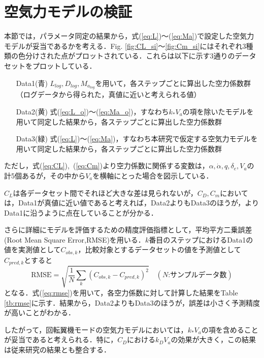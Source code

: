 \section{空気力モデルの検証}
\label{sec:airf_model_ver}

本節では，パラメータ同定の結果から，式(\ref{eq:L})〜(\ref{eq:Ma})で設定した空気力モデルが妥当であるかを考える．Fig. \ref{fig:CL_si}〜\ref{fig:Cm_si}にはそれぞれ3種類の色分けされた点がプロットされている．これらは以下に示す3通りのデータセットをプロットしている．

\begin{itemize}
  \setlength{\leftskip}{1.0cm}
  \setlength{\rightskip}{0.5cm}
  \item[Data1(青)] $L_{log},D_{log},M_{a_{log}}$を用いて，各ステップごとに算出した空力係数群\\（ログデータから得られた，真値に近いと考えられる値）
  \item[Data2(黄)] 式(\ref{eq:L_o})〜(\ref{eq:Ma_o})，すなわち$k_* V_a$の項を除いたモデルを用いて同定した結果から，各ステップごとに算出した空力係数群
  \item[Data3(緑)] 式(\ref{eq:L})〜(\ref{eq:Ma})，すなわち本研究で仮定する空気力モデルを用いて同定した結果から，各ステップごとに算出した空力係数群
\end{itemize}

ただし，式(\ref{eq:CL}),~(\ref{eq:Cm})より空力係数に関係する変数は，$\alpha,\dot{\alpha},q,\delta_e,V_a$の計5個あるが，その中から$V_a$を横軸にとった場合を図示している．

$C_L$は各データセット間でそれほど大きな差は見られないが，$C_D,C_m$においては，Data1が真値に近い値であると考えれば，Data2よりもData3のほうが，よりData1に沿うように点在していることが分かる．

さらに詳細にモデルを評価するための精度評価指標として，平均平方二乗誤差(Root Mean Square Error,RMSE)を用いる．$k$番目のステップにおけるData1の値を実測値として$C_{obs,k}$，比較対象とするデータセットの値を予測値として$C_{pred,k}$とすると
\begin{equation}
  \mbox{RMSE} = \sqrt{\dfrac{1}{N}\sum_{k}(C_{obs,k}-C_{pred,k})^{2}} \quad (N\mbox{:サンプルデータ数})
  \label{eq:rmse}
\end{equation}
となる\cite{}．式(\ref{eq:rmse})を用いて，各空力係数に対して計算した結果をTable \ref{tb:rmse}に示す．結果から，Data2よりもData3のほうが，誤差は小さく予測精度が高いことがわかる．

したがって，回転翼機モードの空気力モデルにおいては，$k_* V_a$の項を含めることが妥当であると考えられる．特に，$C_D$における$k_D V_a$の効果が大きく，この結果は従来研究\cite{}の結果とも整合する．

